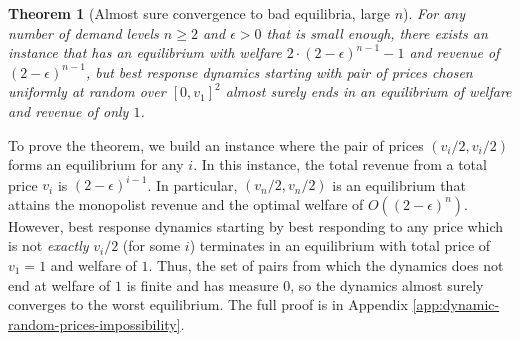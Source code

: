 \documentclass[11pt,a4paper]{article}
\newtheorem{theorem}{Theorem}[section]
\begin{document}
\begin{theorem}[Almost sure convergence to bad equilibria, large $n$]
	\label{thm:almost-sure-bed}
	For any %
	number of demand levels $n\geq 2$  and $\epsilon>0$ that is small enough,
	there exists an instance %
	that has an equilibrium with welfare $2\cdot (2-\epsilon)^{n-1}-1 $ %
	and revenue of $(2-\epsilon)^{n-1}$,
	but best response dynamics starting with pair of prices chosen uniformly at random over
	 $[0,v_1]^2$ almost surely ends in an equilibrium of welfare and revenue of only $1$. %
\end{theorem}

To prove the theorem, we build an instance where
the pair of prices $(v_i/2, v_i/2)$ forms an equilibrium for any $i$.
In this instance, the total revenue from a total price $v_i$ is $(2-\epsilon)^{i-1}$.
In particular, $(v_n/2, v_n/2)$ is an equilibrium that attains the monopolist revenue and the optimal welfare of $O((2-\epsilon)^n)$.
However, best response dynamics starting by best responding to any price
which is not \emph{exactly} $v_i/2$ (for some $i$)
terminates in an equilibrium with total price of $v_1=1$ and welfare of $1$. Thus, the set of pairs from which the dynamics does not end at welfare of $1$ is finite and has measure $0$, so the dynamics almost surely converges to the worst equilibrium. The full proof is in Appendix \ref{app:dynamic-random-prices-impossibility}.
\end{document}
